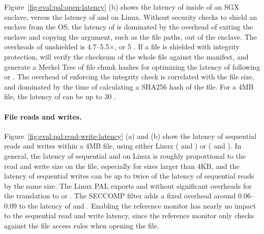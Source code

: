 Figure~\ref{fig:eval:pal:open-latency} (b) shows the latency of  inside of an SGX enclave, versus the latency of 
 and  on Linux.
Without security checks to shield an enclave from the OS,
the latency of  is dominated by the overhead of exiting the enclave and copying the argument, such as the file paths, out of the enclave.
The overheads of unshielded  is 4.7--5.5$\times$, or \roughly{}5 \usec{}.
If a file is shielded with integrity protection,
 will verify the checksum of the whole file against the manifest, and generate a Merkel Tree of file chunk hashes
for optimizing the latency of following  or .
The overhead of enforcing the integrity check is correlated with the file size, and dominated by the time of
calculating a SHA256 hash of the file.
For a 4MB file, the latency of  can be up to \roughly{}30 \msec{}.









\paragraph{File reads and writes.}
Figure~\ref{fig:eval:pal:read-write-latency} (a) and (b) show the latency of sequential reads and writes within a 4MB file, using either Linux \linuxapis{} ( and )
or \hostapis{} ( and ).
In general, the latency of sequential  and 
\linuxapis{} on Linux
is roughly proportional to the read and write size on the file,
especially for sizes larger than 4KB, and the latency of sequential writes can be up to twice of the latency of sequential reads by the same size. 
The Linux PAL exports  and 
without significant overheads
for the translation to  or  \linuxapis{}.
The SECCOMP filter adds a fixed overhead around 0.06--0.09 \msec{} to the latency of  and .
Enabling the reference monitor has nearly no impact to the sequential read and write latency,
since the reference monitor only checks against the file access rules
when opening the file.
 


